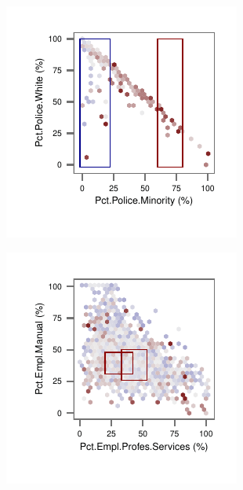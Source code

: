 \begin{figure}[t!]
    \begin{subfigure}[b]{0.42\columnwidth}
    \includegraphics[width=\textwidth]{plots/crime3}
    \end{subfigure}
    \begin{subfigure}[b]{0.42\columnwidth}
    \includegraphics[width=\textwidth]{plots/crime4}
    \end{subfigure}
    

\end{figure}
